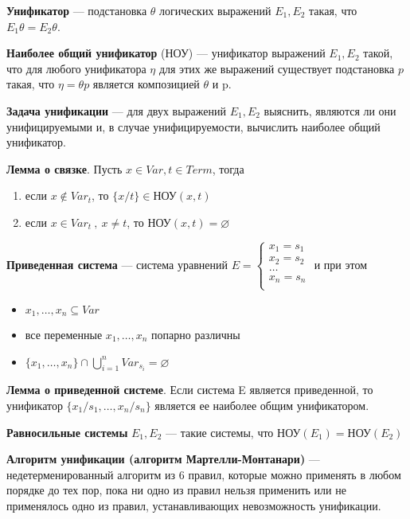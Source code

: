 \documentclass[a4paper,12pt]{article}
\begin{document}
\textbf{Унификатор} --- подстановка $\theta$ логических выражений $E_1,E_2$ такая, что $E_1\theta = E_2\theta$.

\textbf{Наиболее общий унификатор} (НОУ) --- унификатор выражений $E_1,E_2$ такой, что для любого унификатора $\eta$ для этих же выражений существует подстановка $p$ такая, что $\eta = \theta p$ является композицией $\theta$ и p.

\textbf{Задача унификации} --- для двух выражений $E_1,E_2$ выяснить, являются ли они унифицируемыми и, в случае унифицируемости, вычислить наиболее общий унификатор.


\textbf{Лемма о связке}. Пусть $x \in Var, t \in Term$, тогда
\begin{enumerate}
 \item если $x \notin Var_t$, то $\{x/t\} \in \text{НОУ}(x,t)$
 \item если $x \in Var_t~,~x \neq t$, то $\text{НОУ}(x,t) = \varnothing$
\end{enumerate}

\textbf{Приведенная система} --- система уравнений
$
E =
\begin{cases}
x_1 = s_1 \\
x_2 = s_2 \\
\dots \\
x_n = s_n \\
\end{cases}
$
и при этом
\begin{itemize}
 \item $x_1, \dots, x_n \subseteq Var$
 \item все переменные $x_1, \dots, x_n$ попарно различны
 \item $\{x_1, \dots, x_n\} \cap \bigcup\limits_{i=1}^n Var_{s_i} = \varnothing$
\end{itemize}

\textbf{Лемма о приведенной системе}. Если система E является приведенной, то унификатор $\{x_1/s_1,\dots,x_n/s_n\}$ является ее наиболее общим унификатором.

\textbf{Равносильные системы} $E_1,E_2$ --- такие системы, что $\text{НОУ}(E_1) = \text{НОУ}(E_2)$

\textbf{Алгоритм унификации (алгоритм Мартелли-Монтанари)} --- недетерменированный алгоритм из 6 правил, которые можно применять в любом порядке до тех пор, пока ни одно из правил нельзя применить или не применялось одно из правил, устанавливающих невозможность унификации.
\end{document}
